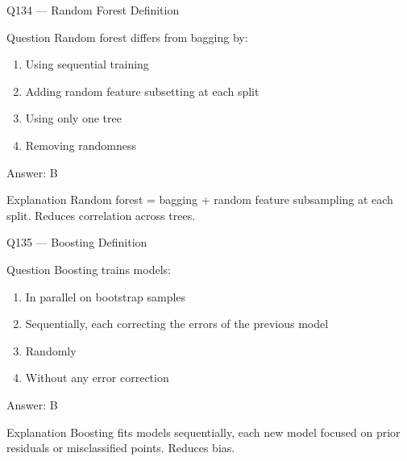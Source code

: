 \documentclass[aspectratio=169,8pt]{beamer}
\begin{document}
	\begin{frame}{Q134 --- Random Forest Definition}
		\begin{block}{Question}
			Random forest differs from bagging by:
			\begin{enumerate}
				\item Using sequential training
				\item Adding random feature subsetting at each split
				\item Using only one tree
				\item Removing randomness
			\end{enumerate}
		\end{block}
		\begin{exampleblock}{Answer: B}\end{exampleblock}
		\begin{block}{Explanation}
			Random forest = bagging + random feature subsampling at each split. Reduces correlation across trees.
		\end{block}
	\end{frame}
	
	\begin{frame}{Q135 --- Boosting Definition}
		\begin{block}{Question}
			Boosting trains models:
			\begin{enumerate}
				\item In parallel on bootstrap samples
				\item Sequentially, each correcting the errors of the previous model
				\item Randomly
				\item Without any error correction
			\end{enumerate}
		\end{block}
		\begin{exampleblock}{Answer: B}\end{exampleblock}
		\begin{block}{Explanation}
			Boosting fits models sequentially, each new model focused on prior residuals or misclassified points. Reduces bias.
		\end{block}
	\end{frame}
	
\end{document}
